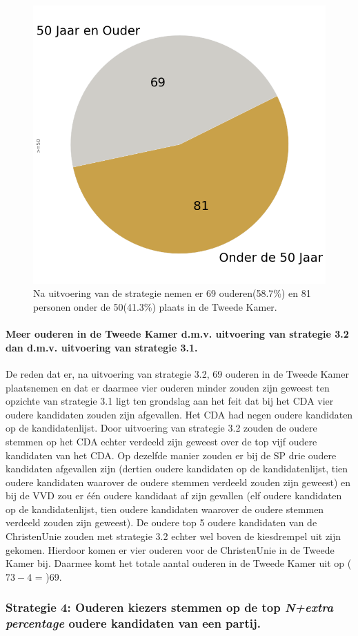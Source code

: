 \begin{figure}[H]
\centering
	\includegraphics[width=0.40\linewidth]{pie_chart_eigenX_ouderen.png}

\caption{Na uitvoering van de strategie nemen er 69 ouderen(58.7\%) en 81 personen onder de 50(41.3\%) plaats in de Tweede Kamer.} 

\label{fig:pcS32O}
\end{figure}

\paragraph{Meer ouderen in de Tweede Kamer d.m.v. uitvoering van strategie 3.2 dan d.m.v. uitvoering van strategie 3.1.}
De reden dat er, na uitvoering van strategie 3.2, 69 ouderen in de Tweede Kamer plaatsnemen en dat er daarmee vier ouderen minder zouden zijn geweest ten opzichte van strategie 3.1 ligt ten grondslag aan het feit dat bij het CDA vier oudere kandidaten zouden zijn afgevallen. Het CDA had negen oudere kandidaten op de kandidatenlijst. Door uitvoering van strategie 3.2 zouden de oudere stemmen op het CDA echter verdeeld zijn geweest over de top vijf oudere kandidaten van het CDA. Op dezelfde manier zouden er bij de SP drie oudere kandidaten afgevallen zijn (dertien oudere kandidaten op de kandidatenlijst, tien oudere kandidaten waarover de oudere stemmen verdeeld zouden zijn geweest) en bij de VVD zou er één oudere kandidaat af zijn gevallen (elf oudere kandidaten op de kandidatenlijst, tien oudere kandidaten waarover de oudere stemmen verdeeld zouden zijn geweest). De oudere top 5 oudere kandidaten van de ChristenUnie zouden met strategie 3.2 echter wel boven de kiesdrempel uit zijn gekomen. Hierdoor komen er vier ouderen voor de ChristenUnie in de Tweede Kamer bij. Daarmee komt het totale aantal ouderen in de Tweede Kamer uit op ($73-4$ = )69.








\subsubsection{Strategie 4: Ouderen kiezers stemmen op de top \textit{N+extra percentage} oudere kandidaten van een partij.}

